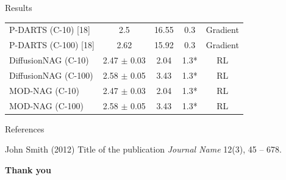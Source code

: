 \documentclass[aspectratio=169,xcolor=dvipsnames]{beamer}
\begin{document}
\begin{frame}{Results}
\begin{table}[h]
\begin{tabular}{lcccc}
            P-DARTS (C-10) {[}18{]}         & 2.5                     & 16.55                & 0.3                             & Gradient               \\
            P-DARTS (C-100) {[}18{]}        & 2.62                    & 15.92                & 0.3                             & Gradient               \\
            DiffusionNAG (C-10)             & 2.47 $\pm$ 0.03         & 2.04                 & 1.3*                            & RL                     \\
            DiffusionNAG (C-100)            & 2.58 $\pm$ 0.05         & 3.43                 & 1.3*                            & RL                     \\
            MOD-NAG (C-10)                  & 2.47 $\pm$ 0.03         & 2.04                 & 1.3*                            & RL                     \\
            MOD-NAG (C-100)                 & 2.58 $\pm$ 0.05         & 3.43                 & 1.3*                            & RL                     \\
        \end{tabular}
    \end{table}

\end{frame}

\begin{frame}{References}
    \footnotesize{
        \begin{thebibliography}{99}
             John Smith (2012)
            \newblock Title of the publication
            \newblock \emph{Journal Name} 12(3), 45 -- 678.
        \end{thebibliography}
    }
\end{frame}


\begin{frame}
    \Huge{\centerline{\textbf{Thank you}}}
\end{frame}

\end{document}
